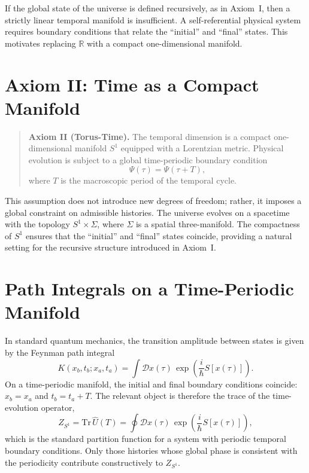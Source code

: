 \documentclass[12pt,openany]{book}
\theoremstyle{plain}
\theoremstyle{definition}
\theoremstyle{remark}
\begin{document}
If the global state of the universe is defined recursively, as in Axiom~I, then
a strictly linear temporal manifold is insufficient. A self-referential physical
system requires boundary conditions that relate the ``initial'' and ``final''
states. This motivates replacing $\mathbb{R}$ with a compact one-dimensional
manifold.

\section{Axiom II: Time as a Compact Manifold}
\begin{quote}
\textbf{Axiom II (Torus-Time).}  
The temporal dimension is a compact one-dimensional manifold $S^{1}$ equipped
with a Lorentzian metric. Physical evolution is subject to a global
time-periodic boundary condition
\[
\Psi(\tau) = \Psi(\tau + T),
\]
where $T$ is the macroscopic period of the temporal cycle.
\end{quote}

This assumption does not introduce new degrees of freedom; rather, it imposes a
global constraint on admissible histories. The universe evolves on a spacetime
with the topology $S^{1} \times \Sigma$, where $\Sigma$ is a spatial
three-manifold. The compactness of $S^{1}$ ensures that the ``initial'' and
``final'' states coincide, providing a natural setting for the recursive
structure introduced in Axiom~I.

\section{Path Integrals on a Time-Periodic Manifold}
In standard quantum mechanics, the transition amplitude between states is given
by the Feynman path integral
\[
K(x_b,t_b; x_a,t_a)
  = \int \mathcal{D}x(\tau)\,
    \exp\!\left(\frac{i}{\hbar} S[x(\tau)]\right).
\]
On a time-periodic manifold, the initial and final boundary conditions coincide:
$x_b = x_a$ and $t_b = t_a + T$. The relevant object is therefore the trace of
the time-evolution operator,
\[
Z_{S^{1}} = \mathrm{Tr}\,\hat{U}(T)
          = \oint \mathcal{D}x(\tau)\,
            \exp\!\left(\frac{i}{\hbar} S[x(\tau)]\right),
\]
which is the standard partition function for a system with periodic temporal
boundary conditions. Only those histories whose global phase is consistent with
the periodicity contribute constructively to $Z_{S^{1}}$.
\end{document}
